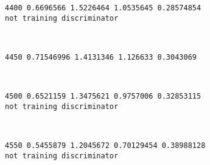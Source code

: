 \documentclass[11pt]{article}
\begin{document}
    \begin{Verbatim}[commandchars=\\\{\}]
4400 0.6696566 1.5226464 1.0535645 0.28574854
not training discriminator

    \end{Verbatim}

    \begin{center}
    \end{center}
    { \hspace*{\fill} \\}
    
    \begin{Verbatim}[commandchars=\\\{\}]
4450 0.71546996 1.4131346 1.126633 0.3043069

    \end{Verbatim}

    \begin{center}
    \end{center}
    { \hspace*{\fill} \\}
    
    \begin{Verbatim}[commandchars=\\\{\}]
4500 0.6521159 1.3475621 0.9757006 0.32853115
not training discriminator

    \end{Verbatim}

    \begin{center}
    \end{center}
    { \hspace*{\fill} \\}
    
    \begin{Verbatim}[commandchars=\\\{\}]
4550 0.5455879 1.2045672 0.70129454 0.38988128
not training discriminator

    \end{Verbatim}

    \begin{center}
    \end{center}
    { \hspace*{\fill} \\}
    
\end{document}
